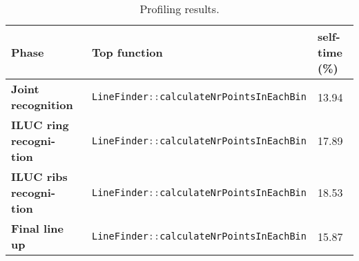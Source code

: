 \begin{table}[H]
    \centering
    \begin{tabular}{|p{4cm}|p{7cm}|p{2.5cm}|}
        \hline
        \textbf{Phase}             & \textbf{Top function}                                          & \textbf{self-time (\%)} \\ \hline
        \textbf{Joint recognition} & \lstinline[language=c]|LineFinder::calculateNrPointsInEachBin| & 13.94                    \\ \hline
        \textbf{ILUC ring recogni-
        tion}                      & \lstinline[language=c]|LineFinder::calculateNrPointsInEachBin| & 17.89                   \\ \hline
        \textbf{ILUC ribs recogni-
        tion}                      & \lstinline[language=c]|LineFinder::calculateNrPointsInEachBin| & 18.53                  \\ \hline
        \textbf{Final line up}     & \lstinline[language=c]|LineFinder::calculateNrPointsInEachBin| & 15.87                   \\ \hline
    \end{tabular}
    \caption{Profiling results.}
    \label{tab:profiling_results}
\end{table}